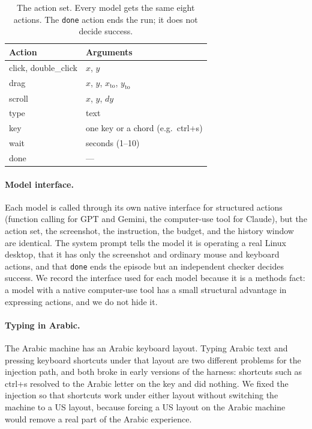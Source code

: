 \begin{table}[t]
\centering
\small
\begin{tabular}{ll}
\toprule
Action & Arguments \\
\midrule
click, double\_click & $x$, $y$ \\
drag & $x$, $y$, $x_{\text{to}}$, $y_{\text{to}}$ \\
scroll & $x$, $y$, $dy$ \\
type & text \\
key & one key or a chord (e.g.\ ctrl+s) \\
wait & seconds (1--10) \\
done & --- \\
\bottomrule
\end{tabular}
\caption{The action set. Every model gets the same eight actions. The
\texttt{done} action ends the run; it does not decide success.}
\label{tab:actions}
\end{table}

\paragraph{Model interface.}
Each model is called through its own native interface for structured actions
(function calling for GPT and Gemini, the computer-use tool for Claude), but
the action set, the screenshot, the instruction, the budget, and the history
window are identical. The system prompt tells the model it is operating a real
Linux desktop, that it has only the screenshot and ordinary mouse and keyboard
actions, and that \texttt{done} ends the episode but an independent checker
decides success. We record the interface used for each model because it is a
methods fact: a model with a native computer-use tool has a small structural
advantage in expressing actions, and we do not hide it.

\paragraph{Typing in Arabic.}
The Arabic machine has an Arabic keyboard layout. Typing Arabic text and
pressing keyboard shortcuts under that layout are two different problems for
the injection path, and both broke in early versions of the harness: shortcuts
such as ctrl+s resolved to the Arabic letter on the key and did nothing.
We fixed the injection so that shortcuts work under either layout without
switching the machine to a US layout, because forcing a US layout on the
Arabic machine would remove a real part of the Arabic experience.

